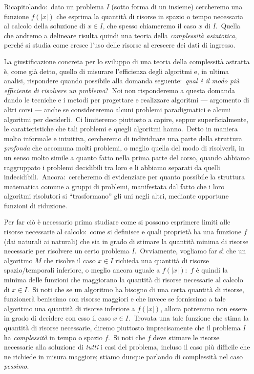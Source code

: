 Ricapitolando:\ dato un problema $I$ (sotto forma di un insieme) cercheremo una funzione $f(|x|)$ che esprima la quantità di risorse in spazio o tempo necessaria al calcolo della soluzione di $x \in I$, che spesso chiameremo il caso $x$ di $I$.\
Quella che andremo a delineare risulta quindi una teoria della \textit{complessità asintotica}, perché si studia come cresce l'uso delle risorse al crescere dei dati di ingresso.\

La giustificazione concreta per lo sviluppo di una teoria della complessità astratta è, come già detto, quello di misurare l'efficienza degli algoritmi e, in ultima analisi, rispondere quando possibile alla domanda seguente:\ \textit{qual è il modo più efficiente di risolvere un problema}?\
Noi non risponderemo a questa domanda dando le tecniche e i metodi per progettare e realizzare algoritmi --- argomento di altri corsi --- anche se considereremo alcuni problemi paradigmatici e alcuni algoritmi per deciderli.\
Ci limiteremo piuttosto a capire, seppur superficialmente, le caratteristiche che tali problemi e quegli algoritmi hanno.\
Detto in maniera molto informale e intuitiva, cercheremo di individuare una parte della struttura \textit{profonda} che accomuna molti problemi, o meglio quella del modo di risolverli, in un senso molto simile a quanto fatto nella prima parte del corso, quando abbiamo raggruppato i problemi decidibili tra loro e li abbiamo separati da quelli indecidibili.\
Ancora:\ cercheremo di evidenziare per quanto possibile la struttura matematica comune a gruppi di problemi, manifestata dal fatto che i loro algoritmi risolutori si ``trasformano'' gli uni negli altri, mediante opportune funzioni di riduzione.\

Per far ciò è necessario prima studiare come si possono esprimere limiti alle risorse necessarie al calcolo:\ come si definisce e quali proprietà ha una funzione $f$ (dai naturali ai naturali) che sia in grado di stimare la quantità minima di risorse necessarie per risolvere un certo problema $I$.\
Ovviamente, vogliamo far sì che un algoritmo $M$ che risolve il caso $x \in I$ richieda una quantità di risorse spazio/temporali inferiore, o meglio ancora uguale a $f(|x|)$:\ $f$ è quindi la minima delle funzioni che maggiorano la quantità di risorse necessarie al calcolo di $x \in I$.\
Si noti che se un algoritmo ha bisogno di una certa quantità di risorse, funzionerà benissimo con risorse maggiori e che invece se fornissimo a tale algoritmo una quantità di risorse inferiore a $f(|x|)$, allora potremmo non essere in grado di decidere con esso il caso $x \in I$.\
Trovata una tale funzione che stima la quantità di risorse necessarie, diremo piuttosto imprecisamente che il problema $I$ ha \textit{complessità} in tempo o spazio $f$.\
Si noti che $f$ deve stimare le risorse necessarie alla soluzione di \textit{tutti} i casi del problema, incluso il caso più difficile che ne richiede in misura maggiore; stiamo dunque parlando di complessità nel caso \textit{pessimo}.\

